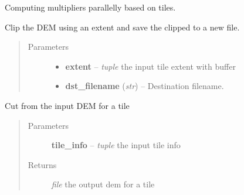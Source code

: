 \documentclass[letterpaper,10pt,english]{sphinxmanual}
\begin{document}
\begin{fulllineitems}
\label{docs/all_multipliers:all_multipliers.Multipliers}
Computing multipliers parallelly based on tiles.


\begin{fulllineitems}
\label{docs/all_multipliers:all_multipliers.Multipliers.clip_dataset}
Clip the DEM using an extent and save the clipped to a new file.
\begin{quote}\begin{description}
\item[{Parameters}] \leavevmode\begin{itemize}
\item {} 
\textbf{extent} -- \emph{tuple} the input tile extent with buffer

\item {} 
\textbf{dst\_filename} (\emph{str}) -- Destination filename.

\end{itemize}

\end{description}\end{quote}

\end{fulllineitems}



\begin{fulllineitems}
\label{docs/all_multipliers:all_multipliers.Multipliers.cut_dem}
Cut from the input DEM for a tile
\begin{quote}\begin{description}
\item[{Parameters}] \leavevmode
\textbf{tile\_info} -- \emph{tuple} the input tile info

\item[{Returns}] \leavevmode
\emph{file} the output dem for a tile

\end{description}\end{quote}

\end{fulllineitems}



\end{fulllineitems}
\end{document}

